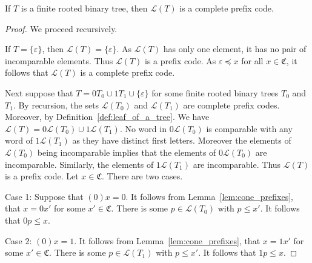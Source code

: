 \begin{lemma}\label{lem:tree_to_codes}
    If \(T\) is a finite rooted binary tree, then \(\mathcal{L}(T)\) is a complete prefix code.
\end{lemma}
\begin{proof}
    We proceed recursively.

    If \(T=\{\varepsilon\}\), then \(\mathcal{L}(T)=\{\varepsilon\}\). As \(\mathcal{L}(T)\) has only one element, it has no pair of incomparable elements. Thus \(\mathcal{L}(T)\) is a prefix code.
    As \(\varepsilon \preceq x\) for all \(x\in \mathfrak{C}\), it follows that \(\mathcal{L}(T)\) is a complete prefix code.

    Next suppose that \(T=0T_0 \cup 1T_1 \cup \{\varepsilon\}\) for some finite rooted binary trees \(T_0\) and \(T_1\). By recursion, the sets \(\mathcal{L}(T_0)\) and \(\mathcal{L}(T_1)\) are complete prefix codes.
    Moreover, by Definition~\ref{def:leaf_of_a_tree}. We have \(\mathcal{L}(T)=0\mathcal{L}(T_0)\cup 1\mathcal{L}(T_1)\). No word in \(0\mathcal{L}(T_0)\) is comparable with any word of \(1\mathcal{L}(T_1)\) as they have distinct first letters. Moreover the elements of \(\mathcal{L}(T_0)\) being incomparable implies that the elements of \(0\mathcal{L}(T_0)\) are incomparable.
    Similarly, the elements of \(1\mathcal{L}(T_1)\) are incomparable. Thus \(\mathcal{L}(T)\) is a prefix code.
    Let \(x\in \mathfrak{C}\). 
    There are two cases.

    Case 1: Suppose that \((0)x=0\). It follows from Lemma~\ref{lem:cone_prefixes}, that \(x=0x'\) for some \(x'\in \mathfrak{C}\). There is some \(p\in \mathcal{L}(T_0)\) with \(p\leq x'\). It follows that \(0p \leq x\).

    Case 2: \((0)x=1\). It follows from Lemma~\ref{lem:cone_prefixes}, that \(x=1x'\) for some \(x'\in \mathfrak{C}\). There is some \(p\in \mathcal{L}(T_1)\) with \(p\leq x'\). It follows that \(1p \leq x\).
\end{proof}

